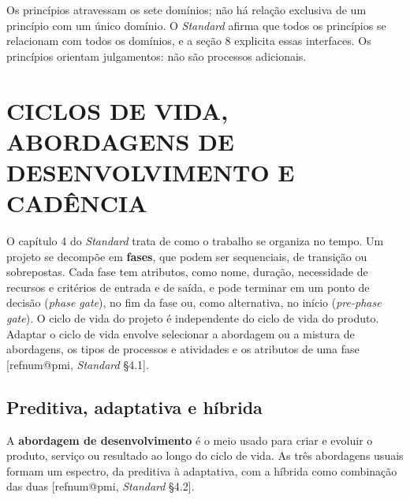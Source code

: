 \documentclass[12pt,a4paper,article,oneside,english,brazil]{abntex2}
\makeatletter
\newcommand{\refnum}[1]{\csname refnum@#1\endcsname}
\makeatother
\begin{document}
Os princípios atravessam os sete domínios; não há relação exclusiva de um princípio com um único domínio. O \textit{Standard} afirma que todos os princípios se relacionam com todos os domínios, e a seção 8 explicita essas interfaces. Os princípios orientam julgamentos: não são processos adicionais.

\section{CICLOS DE VIDA, ABORDAGENS DE DESENVOLVIMENTO E CADÊNCIA}

O capítulo 4 do \textit{Standard} trata de como o trabalho se organiza no tempo. Um projeto se decompõe em \textbf{fases}, que podem ser sequenciais, de transição ou sobrepostas. Cada fase tem atributos, como nome, duração, necessidade de recursos e critérios de entrada e de saída, e pode terminar em um ponto de decisão (\textit{phase gate}), no fim da fase ou, como alternativa, no início (\textit{pre-phase gate}). O ciclo de vida do projeto é independente do ciclo de vida do produto. Adaptar o ciclo de vida envolve selecionar a abordagem ou a mistura de abordagens, os tipos de processos e atividades e os atributos de uma fase [\refnum{pmi}, \textit{Standard} §4.1].
\subsection{Preditiva, adaptativa e híbrida}

A \textbf{abordagem de desenvolvimento} é o meio usado para criar e evoluir o produto, serviço ou resultado ao longo do ciclo de vida. As três abordagens usuais formam um espectro, da preditiva à adaptativa, com a híbrida como combinação das duas [\refnum{pmi}, \textit{Standard} §4.2].
\end{document}
